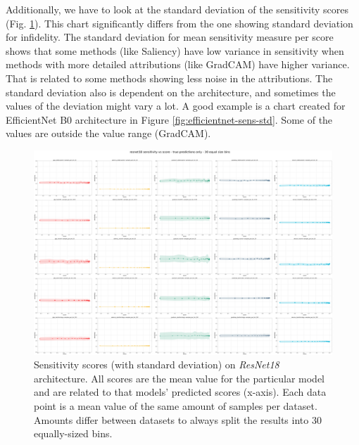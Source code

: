 \vspace{\baselineskip}

Additionally, we have to look at the standard deviation of the sensitivity scores (Fig. \ref{fig:resnet-sens-std}). This chart significantly differs from the one showing standard deviation for infidelity. The standard deviation for mean sensitivity measure per score shows that some methods (like Saliency) have low variance in sensitivity when methods with more detailed attributions (like GradCAM) have higher variance. That is related to some methods showing less noise in the attributions. The standard deviation also is dependent on the architecture, and sometimes the values of the deviation might vary a lot. A good example is a chart created for EfficientNet B0 architecture in Figure \ref{fig:efficientnet-sens-std}. Some of the values are outside the value range (GradCAM).

\begin{figure}[ht]
  \centering
    \includegraphics[width=\textwidth]{results/metrics/resnet18-sensitivity vs score - true predictions only - 30 equal size bins.png}
    \caption{Sensitivity scores (with standard deviation) on \textit{ResNet18} architecture. All scores are the mean value for the particular model and are related to that models' predicted scores (x-axis). Each data point is a mean value of the same amount of samples per dataset. Amounts differ between datasets to always split the results into 30 equally-sized bins.}\label{fig:resnet-sens-std}
\end{figure}

